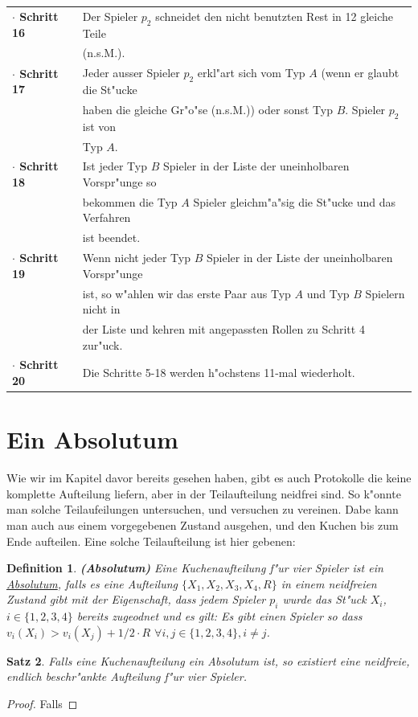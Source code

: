 \documentclass[11pt, a4paper, twoside]{article}
\newtheorem{satz}{Satz}
\newtheorem{defi}[satz]{Definition}
\numberwithin{equation}{section}
\begin{document}
\begin{tabular}{|ll|}
\textbf{$\cdot$ Schritt 16}&Der Spieler $p_2$ schneidet den nicht benutzten Rest in 12 gleiche Teile\\&(n.s.M.).\\ 
\textbf{$\cdot$ Schritt 17}&Jeder ausser Spieler $p_2$ erkl"art sich vom Typ $A$ (wenn er glaubt die St"ucke\\&haben die gleiche Gr"o"se (n.s.M.)) oder sonst Typ $B$. Spieler $p_2$ ist von\\&Typ $A$.\\
\textbf{$\cdot$ Schritt 18}&Ist jeder Typ $B$ Spieler in der Liste der uneinholbaren Vorspr"unge so\\&bekommen die Typ $A$ Spieler gleichm"a"sig die St"ucke und das Verfahren\\&ist beendet.\\
\textbf{$\cdot$ Schritt 19}&Wenn nicht jeder Typ $B$ Spieler in der Liste der uneinholbaren Vorspr"unge\\&ist, so w"ahlen wir das erste Paar aus Typ $A$ und Typ $B$ Spielern nicht in\\&der Liste und kehren mit angepassten Rollen zu Schritt 4 zur"uck.\\
\textbf{$\cdot$ Schritt 20}&Die Schritte 5-18 werden h"ochstens 11-mal wiederholt.\\
\hline
\end{tabular}
\newpage
\section{Ein Absolutum}
Wie wir im Kapitel davor bereits gesehen haben, gibt es auch Protokolle die keine komplette Aufteilung liefern, aber in der Teilaufteilung neidfrei sind. So k"onnte man solche Teilaufeilungen untersuchen, und versuchen zu vereinen. Dabe kann man auch aus einem vorgegebenen Zustand ausgehen, und den Kuchen bis zum Ende aufteilen. Eine solche Teilaufteilung ist hier gebenen:
\begin{defi}{\textbf{(Absolutum)}}
\newline Eine Kuchenaufteilung f"ur vier Spieler ist ein \underline{Absolutum}, falls es eine Aufteilung $\{X_1,X_2,X_3,X_4,R\}$ in einem neidfreien Zustand gibt mit der Eigenschaft, dass jedem Spieler $p_i$ wurde das St"uck $X_i$, $i\in \{1,2,3,4\}$ bereits zugeodnet und es gilt: Es gibt einen Spieler so dass $v_i(X_i)>v_i(X_j)+1/2\cdot R$ $\forall i,j \in \{1,2,3,4\}, i \neq j$. 
\end{defi}
\begin{satz}
Falls eine Kuchenaufteilung ein Absolutum ist, so existiert eine neidfreie, endlich beschr"ankte Aufteilung f"ur vier Spieler.
\end{satz}
\begin{proof}
Falls
\end{proof}
\newpage
\end{document}
